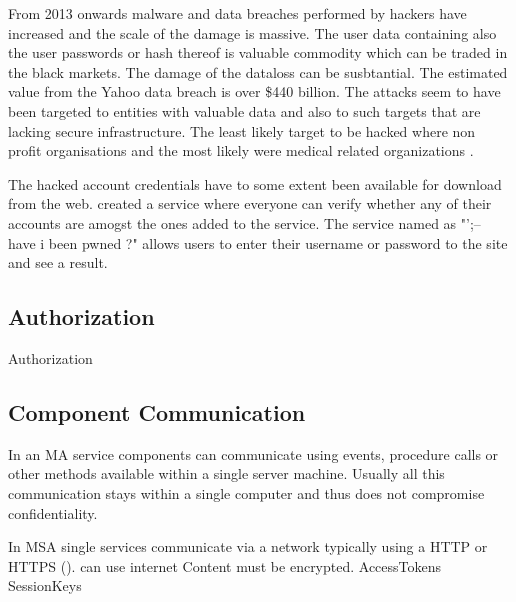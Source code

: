 \begin{sloppypar}
    From 2013 onwards malware and data breaches performed by hackers have 
    increased and the scale of the damage is massive. The user data containing 
    also the user passwords or hash thereof is valuable commodity which can be 
    traded in the black markets. The damage of the dataloss can be susbtantial. 
    The estimated value from the Yahoo data breach is over \$440 billion. The 
    attacks seem to have been targeted to entities with valuable data and 
    also to such targets that are lacking secure infrastructure. The least likely 
    target to be hacked where non profit organisations and the most likely were 
    medical related organizations \citep{breach}.
\end{sloppypar}
\begin{sloppypar}
    The hacked account credentials have to some extent been available for download 
    from the web. \citet{pwned} created a service where everyone can verify 
    whether any of their accounts are amogst the ones added to the service. 
    The service named as "';-- have i been pwned ?" allows users to enter their 
    username or password to the site and see a result.
\end{sloppypar}

\subsection{Authorization}
\begin{sloppypar}
    Authorization 
\end{sloppypar}



\subsection{Component Communication}
\begin{sloppypar}
    In an MA service components can communicate using events, 
    procedure calls or other methods available within a single server machine. 
    Usually all this communication stays within a single computer and thus does not compromise confidentiality.
\end{sloppypar}
\begin{sloppypar}
    In MSA single services communicate via a network typically using a HTTP or HTTPS (). 
    can use internet
    Content must be encrypted.
    AccessTokens
    SessionKeys
\end{sloppypar}

